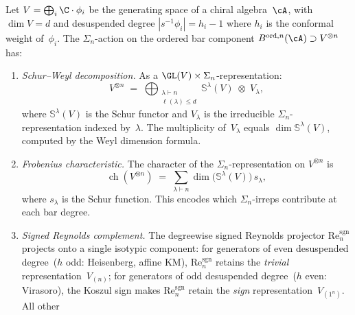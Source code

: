 \begin{proposition}
\label{prop:sn-irrep-decomposition-bar}
Let $V = \bigoplus_{i} \C \cdot \phi_i$ be the generating space of a
chiral algebra~$\cA$, with $\dim V = d$ and desuspended degree
$|s^{-1}\phi_i| = h_i - 1$ where $h_i$ is the conformal weight of~$\phi_i$.
The $\Sigma_n$-action on the ordered bar component
$B^{\mathrm{ord},n}(\cA) \supset V^{\otimes n}$ has:
\begin{enumerate}[label=\textup{(\roman*)}]
\item \emph{Schur--Weyl decomposition.}
 As a $\GL(V) \times \Sigma_n$-representation\textup{:}
 \begin{equation}
 \label{eq:schur-weyl-bar}
 V^{\otimes n}
 \;=\;
 \bigoplus_{\substack{\lambda \vdash n \\ \ell(\lambda) \leq d}}
 \mathbb{S}^\lambda(V)
 \;\otimes\;
 V_\lambda,
 \end{equation}
 where $\mathbb{S}^\lambda(V)$ is the Schur functor and
 $V_\lambda$ is the irreducible $\Sigma_n$-representation
 indexed by~$\lambda$. The multiplicity of~$V_\lambda$ equals
 $\dim \mathbb{S}^\lambda(V)$, computed by the Weyl dimension
 formula.
\item \emph{Frobenius characteristic.}
 The character of the $\Sigma_n$-representation on
 $V^{\otimes n}$ is
 \begin{equation}
 \label{eq:frobenius-char-bar}
 \operatorname{ch}(V^{\otimes n})
 \;=\;
 \sum_{\lambda \vdash n}
 \dim\bigl(\mathbb{S}^\lambda(V)\bigr)\,
 s_\lambda,
 \end{equation}
 where $s_\lambda$ is the Schur function. This encodes which
 $\Sigma_n$-irreps contribute at each bar degree.
\item \emph{Signed Reynolds complement.}
 The degreewise signed Reynolds projector
 $\mathrm{Re}^{\mathrm{sgn}}_n$ projects onto a single
 isotypic component\textup{:} for generators of even desuspended
 degree~\textup{(}$h$ odd: Heisenberg, affine KM\textup{)},
 $\mathrm{Re}^{\mathrm{sgn}}_n$ retains the \emph{trivial}
 representation~$V_{(n)}$\textup{;} for generators of odd
 desuspended degree~\textup{(}$h$ even: Virasoro\textup{)},
 the Koszul sign makes $\mathrm{Re}^{\mathrm{sgn}}_n$ retain the
 \emph{sign} representation~$V_{(1^n)}$. All other

\end{enumerate}
\end{proposition}
